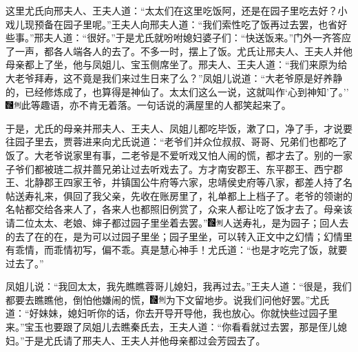 这里尤氏向邢夫人、王夫人道：``太太们在这里吃饭阿，还是在园子里吃去好？小戏儿现预备在园子里呢。''王夫人向邢夫人道：``我们索性吃了饭再过去罢，也省好些事。''邢夫人道：``很好。''于是尤氏就吩咐媳妇婆子们：``快送饭来。''门外一齐答应了一声，都各人端各人的去了。不多一时，摆上了饭。尤氏让邢夫人、王夫人并他母亲都上了坐，他与凤姐儿、宝玉侧席坐了。邢夫人、王夫人道：``我们来原为给大老爷拜寿，这不竟是我们来过生日来了么？''凤姐儿说道：``大老爷原是好养静的，已经修炼成了，也算得是神仙了。太太们这么一说，这就叫作`心到神知'了。''{\includegraphics[width=3mm]{../Images/00006}\includegraphics[width=3mm]{../Images/00011}\footnotesize \kaishu 此等趣语，亦不肯无着落。}一句话说的满屋里的人都笑起来了。

于是，尤氏的母亲并邢夫人、王夫人、凤姐儿都吃毕饭，漱了口，净了手，才说要往园子里去，贾蓉进来向尤氏说道：``老爷们并众位叔叔、哥哥、兄弟们也都吃了饭了。大老爷说家里有事，二老爷是不爱听戏又怕人闹的慌，都才去了。别的一家子爷们都被琏二叔并蔷兄弟让过去听戏去了。方才南安郡王、东平郡王、西宁郡王、北静郡王四家王爷，并镇国公牛府等六家，忠靖侯史府等八家，都差人持了名帖送寿礼来，俱回了我父亲，先收在账房里了，礼单都上上档子了。老爷的领谢的名帖都交给各来人了，各来人也都照旧例赏了，众来人都让吃了饭才去了。母亲该请二位太太、老娘、婶子都过园子里坐着去罢。''{\includegraphics[width=3mm]{../Images/00006}\includegraphics[width=3mm]{../Images/00011}\footnotesize \kaishu 人送寿礼，是为园子；回人去的去了在的在，是为可以过园子里坐；园子里坐，可以转入正文中之幻情；幻情里有乖情，而乖情初写，偏不乖。真是慧心神手！}尤氏道：``也是才吃完了饭，就要过去了。''

凤姐儿说：``我回太太，我先瞧瞧蓉哥儿媳妇，我再过去。''王夫人道：``很是，我们都要去瞧瞧他，倒怕他嫌闹的慌，{\includegraphics[width=3mm]{../Images/00006}\includegraphics[width=3mm]{../Images/00011}\footnotesize \kaishu 为下文留地步。}说我们问他好罢。''尤氏道：``好妹妹，媳妇听你的话，你去开导开导他，我也放心。你就快些过园子里来。''宝玉也要跟了凤姐儿去瞧秦氏去，王夫人道：``你看看就过去罢，那是侄儿媳妇。''于是尤氏请了邢夫人、王夫人并他母亲都过会芳园去了。

